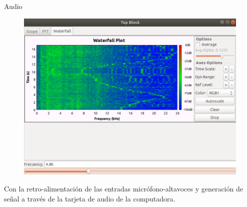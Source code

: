 \begin{frame}{Audio}

\begin{figure}
\begin{center}
\vspace{-8mm}
\includegraphics[width=\textwidth, height=0.6\paperheight]{lab3/pdf/lab3_10.pdf}
\end{center}
\end{figure}
\vspace{-5mm}
\tiny
Con la retro-alimentación de las entradas micrófono-altavoces y generación de señal a través de la tarjeta de audio de la computadora.

\end{frame}
